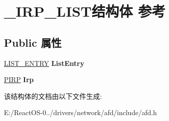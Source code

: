 \hypertarget{struct___i_r_p___l_i_s_t}{}\section{\+\_\+\+I\+R\+P\+\_\+\+L\+I\+S\+T结构体 参考}
\label{struct___i_r_p___l_i_s_t}
\subsection*{Public 属性}
\begin{DoxyCompactItemize}
\item 
\mbox{\label{struct___i_r_p___l_i_s_t_ae17401711e7b1646e6efaedeb0dc7772}} 
\hyperlink{struct___l_i_s_t___e_n_t_r_y}{L\+I\+S\+T\+\_\+\+E\+N\+T\+RY} {\bfseries List\+Entry}
\item 
\mbox{\label{struct___i_r_p___l_i_s_t_a81e7ca15527c366ee8c61b0ac334c656}} 
\hyperlink{interfacevoid}{P\+I\+RP} {\bfseries Irp}
\end{DoxyCompactItemize}


该结构体的文档由以下文件生成\+:\begin{DoxyCompactItemize}
\item 
E\+:/\+React\+O\+S-\/0../drivers/network/afd/include/afd.\+h\end{DoxyCompactItemize}
